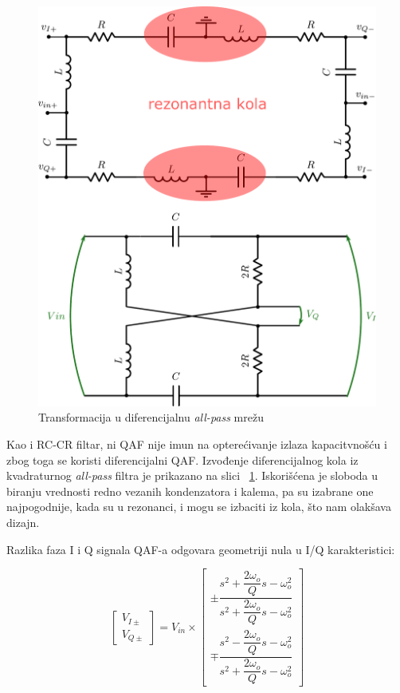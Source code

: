 \documentclass[journal,twocolumn,letterpaper]{IEEEJERM}
\begin{document}
\begin{figure}[!htbp]
  \centering
  \includegraphics[width=\linewidth]{qaf_diff.pdf}
  \caption{Transformacija u diferencijalnu \textit{all-pass} mrežu}
  \label{fig:qaf_diff}
\end{figure}

Kao i RC-CR filtar, ni QAF nije imun na opterećivanje izlaza kapacitvnošću i zbog toga se koristi diferencijalni QAF. Izvođenje diferencijalnog kola iz kvadraturnog \textit{all-pass} filtra je prikazano na slici ~\ref{fig:qaf_diff}. Iskorišćena je sloboda u biranju vrednosti redno vezanih kondenzatora i kalema, pa su izabrane one najpogodnije, kada su u rezonanci, i  mogu se izbaciti iz kola, što nam olakšava dizajn.

Razlika faza I i Q signala QAF-a odgovara geometriji nula u I/Q karakteristici:


\[
\begin{bmatrix}
    V_{I\pm}      \\
    V_{Q\pm}    
\end{bmatrix}   
=
V_{in} \times
\begin{bmatrix}
    \pm \dfrac{s^2 + \dfrac{2 \omega_{o}}{Q} s - \omega_{o}^2}{s^2 + \dfrac{2\omega_{o}}{Q} s - \omega_{o}^2} \\
    \mp \dfrac{s^2 - \dfrac{2 \omega_{o}}{Q} s - \omega_{o}^2}{s^2 + \dfrac{2\omega_{o}}{Q} s - \omega_{o}^2}
\end{bmatrix}
\]
\end{document}

